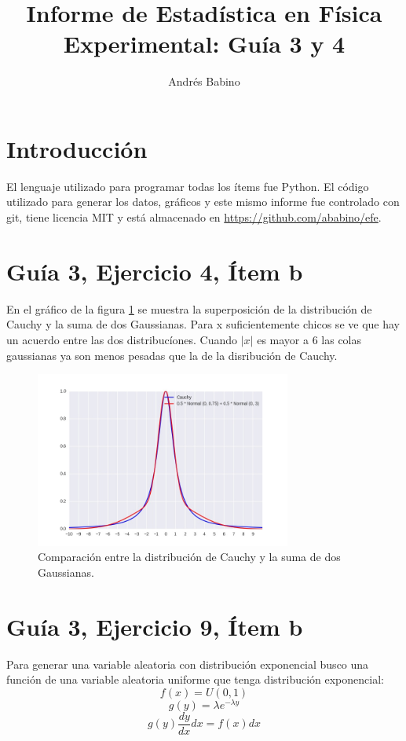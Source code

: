 \documentclass{article}
\title{Informe de Estadística en Física Experimental: Guía 3 y 4}
\author{Andr\'es Babino}
\begin{document}
\maketitle
\section{Introducción}
El lenguaje utilizado para programar todas los ítems fue Python.
El código utilizado para generar los datos, gráficos y este mismo informe fue controlado con git, tiene licencia MIT y está almacenado en \url{https://github.com/ababino/efe}.

\section{Guía 3, Ejercicio 4, Ítem b}
En el gráfico de la figura \ref{fig:ej4b} se muestra la superposición de la distribución de Cauchy y la suma de dos Gaussianas.
Para x suficientemente chicos se ve que hay un acuerdo entre las dos distribucíones. 
Cuando $|x|$ es mayor a $6$ las colas gaussianas ya son menos pesadas que la de la disribución de Cauchy.


\begin{figure}
\centering
\includegraphics[width=0.75\textwidth]{ej4b.jpg}
\caption[]{Comparación entre la distribución de Cauchy y la suma de dos Gaussianas.}
\label{fig:ej4b}
\end{figure}

\section{Guía 3, Ejercicio 9, Ítem b}
Para generar una variable aleatoria con distribución exponencial busco una función de una variable aleatoria uniforme que tenga distribución exponencial:
$$f (x) = U(0, 1)$$
$$ g(y) = \lambda e^{-\lambda y}$$
$$g(y) \frac{dy}{dx} dx= f(x) dx $$
\end{document}
